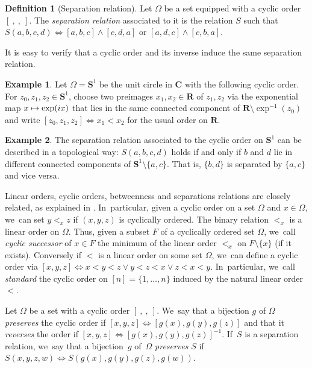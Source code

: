 \documentclass[10pt,a4paper]{amsart}
\theoremstyle{definition}
\newtheorem{definition}[definition]{Definition}
\newtheorem{example}[example]{Example}
\newcommand\mto{\mathchoice{\longmapsto}{\mapsto}{\mapsto}{\mapsto}}
\begin{document}
\begin{definition}[Separation relation]
\label{def.separation.relation}
Let $\Omega$ be a set equipped with a cyclic order $[\ ,\ ,\ ]$.
The \emph{separation relation} associated to it is the relation $S$ such that $S(a,b,c,d) \iff [a,b,c]\wedge [c,d,a]$ or $[a,d,c]\wedge [c,b,a]$.
\end{definition}

It is easy to verify that a cyclic order and its inverse induce the same separation relation.

\begin{example}
Let $\Omega=\mathbf{S}^1$ be the unit circle in $\mathbf{C}$ with the following cyclic order.
For $z_0,z_1,z_2\in \mathbf{S}^1$, choose two preimages $x_1,x_2\in\mathbf{R}$ of $z_1,z_2$ via the exponential map $x\mto \exp(ix)$ that lies in the same connected component of $\mathbf{R}\setminus\exp^{-1}(z_0)$ and write $[z_0,z_1,z_2]\iff x_1<x_2$ for the usual order on $\mathbf{R}$.
\end{example}

\begin{example}
The separation relation associated to the cyclic order on $\mathbf{S}^1$ can be described in a topological way:
$S(a,b,c,d)$ holds if and only if $b$ and $d$ lie in different connected components of $\mathbf{S}^1\setminus\{a,c\}$.
That is, $\{b,d\}$ is separated by $\{a,c\}$ and vice versa.
\end{example}

Linear orders, cyclic orders, betweenness and separations relations are closely related, as explained in \cite{Huntington}. In~particular, given a cyclic order on a set $\Omega$ and $x\in\Omega$, we~can set $y<_xz$ if $(x,y,z)$ is cyclically ordered.
The binary relation $<_x$ is a linear order on $\Omega$.
Thus, given a subset $F$ of a cyclically ordered set $\Omega$, we~call \emph{cyclic successor} of $x\in F$ the minimum of the linear order $<_x$ on $F\setminus\{x\}$ (if it exists).
Conversely if $<$ is a linear order on some set $\Omega$, we~can define a cyclic order via $[x,y,z]\iff x<y<z\vee y<z<x \vee z<x<y$. In~particular, we~call \emph{standard} the cyclic order on $[n]=\{1,\dots,n\}$ induced by the natural linear order $<$.

Let $\Omega$ be a set with a cyclic order $[\ ,\ ,\ ]$. We~say that a bijection $g$ of $\Omega$ \emph{preserves} the cyclic order if $[x,y,z]\iff [g(x),g(y),g(z)]$ and that it \emph{reverses} the order if $[x,y,z]\iff [g(x),g(y),g(z)]^{-1}$. If~$S$ is a separation relation, we~say that a bijection~$g$ of~$\Omega$ \emph{preserves} $S$ if $S(x,y,z,w)\iff S(g(x),g(y),g(z),g(w))$.
\end{document}
